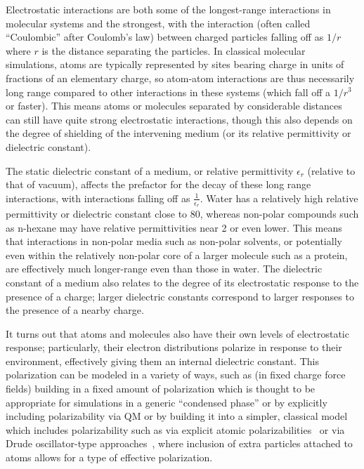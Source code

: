 \documentclass[9pt,bestpractices]{livecoms}
\begin{document}
Electrostatic interactions are both some of the longest-range interactions in molecular systems and the strongest, with the interaction (often called
``Coulombic'' after Coulomb's law) between charged particles falling off as $1/r$ where $r$ is the distance separating the particles. 
In classical molecular simulations, atoms are typically represented by sites bearing charge in units of fractions of an elementary charge, so atom-atom interactions are thus necessarily long range compared to other interactions in these systems (which fall off a $1/r^3$ or faster).  
This means atoms or molecules separated by considerable distances can still have quite strong electrostatic interactions, though this also depends on the degree of shielding of the intervening medium (or its relative permittivity or dielectric constant).

The static dielectric constant of a medium, or relative permittivity $\epsilon_r$ (relative to that of vacuum), affects the prefactor for the decay of these long range interactions, with interactions falling off as $\frac{1}{\epsilon_r}$. 
Water has a relatively high relative permittivity or dielectric constant close to 80, whereas non-polar compounds such as n-hexane may have relative permittivities near 2 or even lower. 
This means that interactions in non-polar media such as non-polar solvents, or potentially even within the relatively non-polar core of a larger molecule such as a protein, are effectively much longer-range even than those in water. 
The dielectric constant of a medium also relates to the degree of its electrostatic response to the presence of a charge; larger dielectric constants correspond to larger responses to the presence of a nearby charge.

It turns out that atoms and molecules also have their own levels of electrostatic response; particularly, their electron distributions polarize in response to their environment, effectively giving them an internal dielectric constant. 
This polarization can be modeled in a variety of ways, such as (in fixed charge force fields) building in a fixed amount of polarization which is thought to be appropriate for simulations in a generic ``condensed phase'' or by explicitly including polarizability via QM or by building it into a simpler, classical model which includes polarizability such as via explicit atomic polarizabilities~\cite{Ponder2003, Ponder:2010:J.Phys.Chem.B} or via Drude oscillator-type approaches~\cite{Lemkul:2016:Chem.Rev.}, where inclusion of extra particles attached to atoms allows for a type of effective polarization.
\end{document}
